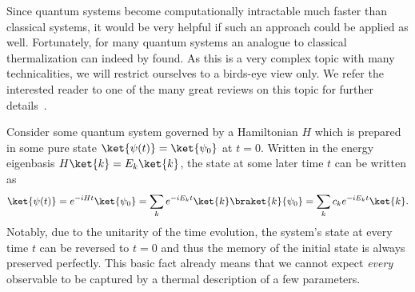 Since quantum systems become computationally intractable much faster than classical systems, it would be very helpful if such an approach could be applied as well. Fortunately, for many quantum systems an analogue to classical thermalization can indeed by found. 
As this is a very complex topic with many technicalities, we will restrict ourselves to a birds-eye view only. We refer the interested reader to one of the many great reviews on this topic for further details~\cite{gogolinEquilibrationThermalisationEmergence2016,dalessioQuantumChaosEigenstate2016,deutschEigenstateThermalizationHypothesis2018,moriThermalizationPrethermalizationIsolated2018}.

Consider some quantum system governed by a Hamiltonian $H$ which is prepared in some pure state $\ket{\psi(t)}=\ket{\psi_0}$ at $t=0$. Written in the energy eigenbasis $H\ket{k}=E_k\ket{k}$, the state at some later time $t$ can be written as
\begin{equation}
	\ket{\psi(t)} = e^{-iHt}\ket{\psi_0} = \sum_k e^{-iE_kt}\ket{k}\braket{k}{\psi_0}	= \sum_k c_k e^{-iE_kt}\ket{k}.
\end{equation}
Notably, due to the unitarity of the time evolution, the system's state at every time $t$ can be reversed to $t=0$ and thus the memory of the initial state is always preserved perfectly. This basic fact already means that we cannot expect \emph{every} observable to be captured by a thermal description of a few parameters.

